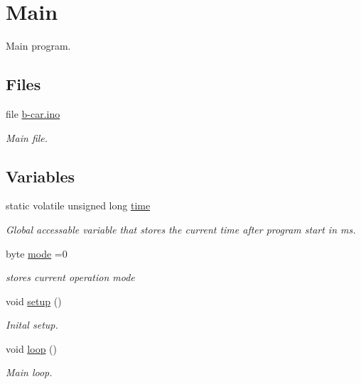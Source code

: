 \hypertarget{group__main}{}\section{Main}
\label{group__main}


Main program.  


\subsection*{Files}
\begin{DoxyCompactItemize}
\item 
file \hyperlink{b-car_8ino}{b-\/car.\+ino}
\begin{DoxyCompactList}\small\item\em Main file. \end{DoxyCompactList}\end{DoxyCompactItemize}
\subsection*{Variables}
\begin{DoxyCompactItemize}
\item 
static volatile unsigned long \hyperlink{group__main_ga4f944bfefd58754546ebcc7c5143442c}{time}
\begin{DoxyCompactList}\small\item\em Global accessable variable that stores the current time after program start in ms. \end{DoxyCompactList}\item 
byte \hyperlink{group__main_ga988166baebc4b27bd18de27cd40f8b5a}{mode} =0
\begin{DoxyCompactList}\small\item\em stores current operation mode \end{DoxyCompactList}\end{DoxyCompactItemize}
\begin{DoxyCompactItemize}
\item 
void \hyperlink{group__main_ga4fc01d736fe50cf5b977f755b675f11d}{setup} ()
\begin{DoxyCompactList}\small\item\em Inital setup. \end{DoxyCompactList}\item 
void \hyperlink{group__main_gafe461d27b9c48d5921c00d521181f12f}{loop} ()
\begin{DoxyCompactList}\small\item\em Main loop. \end{DoxyCompactList}\end{DoxyCompactItemize}


